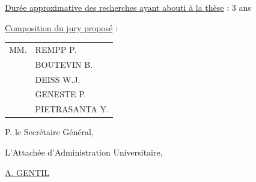 \uline{Durée approximative des recherches ayant abouti à la thèse} : 3 ans

\uline{Composition du jury proposé} :
\begin{tabular}{ll}
MM.&REMPP P.\\
& BOUTEVIN B.\\
& DEISS W.J.\\
& GENESTE P.\\
& PIETRASANTA Y.
\end{tabular}

P. le Secrétaire Général,

L'Attachée d'Administration Universitaire,

\uline{}

\uline{A. GENTIL}
